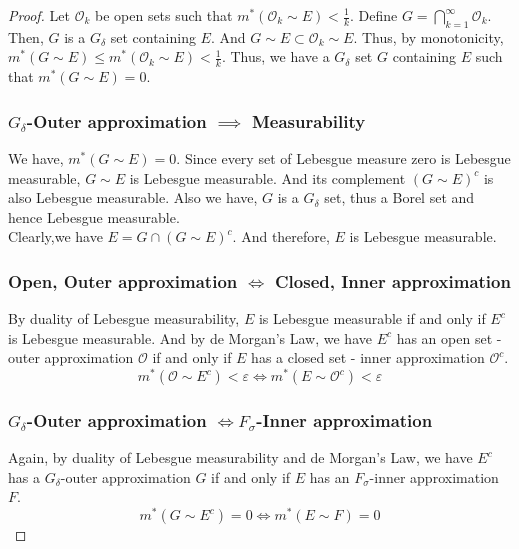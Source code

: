 \begin{proof}
	Let $\mathcal{O}_k$ be open sets such that $m^\ast(\mathcal{O}_k \sim E) < \frac{1}{k}$.
	Define $\displaystyle G = \bigcap_{k=1}^\infty \mathcal{O}_k$.
	Then, $G$ is a $G_\delta$ set containing $E$.
	And $G \sim E \subset \mathcal{O}_k \sim E$.
	Thus, by monotonicity, $m^\ast(G \sim E) \le m^\ast(\mathcal{O}_k \sim E) < \frac{1}{k}$.
	Thus, we have a $G_\delta$ set $G$ containing $E$ such that $m^\ast(G \sim E) = 0$.

\subsubsection*{$G_\delta$-Outer approximation $\implies$ Measurability}
	We have, $m^\ast(G \sim  E) = 0$.
	Since every set of Lebesgue measure zero is Lebesgue measurable, $G \sim E$ is Lebesgue measurable.
	And its complement $(G \sim E)^c$ is also Lebesgue measurable.
	Also we have, $G$ is a $G_\delta$ set, thus a Borel set and hence Lebesgue measurable.\\

	Clearly,we have $E = G \cap (G \sim E)^c$.
	And therefore, $E$ is Lebesgue measurable.

\subsubsection*{Open, Outer approximation $\iff$ Closed, Inner approximation}
	By duality of Lebesgue measurability, $E$ is Lebesgue measurable if and only if $E^c$ is Lebesgue measurable.
	And by de Morgan's Law, we have $E^c$ has an open set - outer approximation $\mathcal{O}$ if and only if $E$ has a closed set - inner approximation $\mathcal{O}^c$.
	\[ m^\ast(\mathcal{O} \sim E^c) < \varepsilon \iff m^\ast(E \sim \mathcal{O}^c) < \varepsilon \]

\subsubsection*{$G_\delta$-Outer approximation $\iff F_\sigma$-Inner approximation}
	Again, by duality of Lebesgue measurability and de Morgan's Law, we have $E^c$ has a $G_\delta$-outer approximation $G$ if and only if $E$ has an $F_\sigma$-inner approximation $F$.
	\[ m^\ast(G \sim E^c) = 0 \iff m^\ast(E \sim F) = 0 \]
\end{proof}

